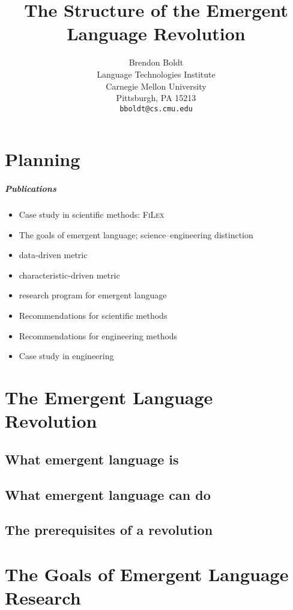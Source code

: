 \documentclass[letterpaper]{report}
\title{The Structure of the Emergent Language Revolution}
\author{%
  Brendon Boldt\\
  Language Technologies Institute\\
  Carnegie Mellon University\\
  Pittsburgh, PA 15213 \\
  \texttt{bboldt@cs.cmu.edu} \\
}
\begin{document}
\maketitle

\tableofcontents

\chapter*{Planning}

\paragraph{Publications}
\begin{itemize}
    \item{}  Case study in scientific methods: \textsc{FiLex}
    \item{}  The goals of emergent language; science--engineering distinction
    \item{}   data-driven metric
    \item{}   characteristic-driven metric
    \item{}  research program for emergent language
    \item{}  Recommendations for scientific methods
    \item{}  Recommendations for engineering methods
    \item{}   Case study in engineering
\end{itemize}

\chapter{The Emergent Language Revolution}
\section{What emergent language is}
\section{What emergent language can do}
\section{The prerequisites of a revolution}

\chapter{The Goals of Emergent Language Research}
\end{document}
